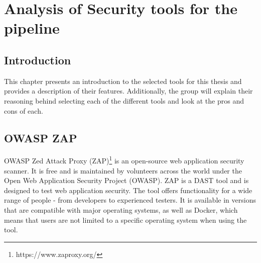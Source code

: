 \chapter{Analysis of Security tools for the pipeline}
\label{chap:Tools}
\section{Introduction}
This chapter presents an introduction to the selected tools for this thesis and provides a description of their features. Additionally, the group will explain their reasoning behind selecting each of the different tools and look at the pros and cons of each. 




\section{OWASP ZAP}
OWASP Zed Attack Proxy (ZAP)\footnote{https://www.zaproxy.org/} is an open-source web application security scanner. It is free and is maintained by volunteers across the world under the Open Web Application Security Project (OWASP). ZAP is a DAST tool and is designed to test web application security. The tool offers functionality for a wide range of people - from developers to experienced testers. It is available in versions that are compatible with major operating systems, as well as Docker, which means that users are not limited to a specific operating system when using the tool.\cite{owaspZAP}

